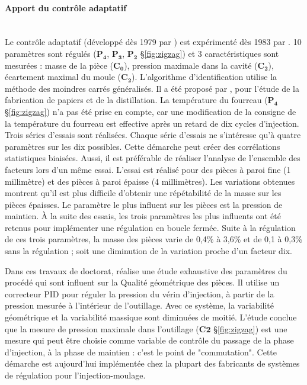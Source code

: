 \paragraph{Apport du contrôle adaptatif}\mbox{} \\
Le contrôle adaptatif (développé dès 1979 par \cite{landau_adaptive_1979, egardt_stability_1979}) est expérimenté dès 1983 par \cite{sanschagrin_process_1983}.
10 paramètres sont régulés ($\boldsymbol{P_4}$, $\boldsymbol{P_3}$, $\boldsymbol{P_2}$ §\ref{fig:zigzag}) et 3 caractéristiques sont mesurées : masse de la pièce ($\boldsymbol{C_0}$), pression maximale dans la cavité ($\boldsymbol{C_2}$), écartement maximal du moule ($\boldsymbol{C_2}$).
L'algorithme d'identification utilise la méthode des moindres carrés généralisés.
Il a été proposé par \cite{bethoux_approche_1976}, pour l'étude de la fabrication de papiers et de la distillation.
La température du fourreau ($\boldsymbol{P_4}$ §\ref{fig:zigzag}) n'a pas été prise en compte, car une modification de la consigne de la température du fourreau est effective après un retard de dix cycles d’injection.
Trois séries d'essais sont réalisées.
Chaque série d’essais ne s’intéresse qu’à quatre paramètres sur les dix possibles.
Cette démarche peut créer des corrélations statistiques biaisées.
Aussi, il est préférable de réaliser l'analyse de l'ensemble des facteurs lors d'un même essai.
L'essai est réalisé pour des pièces à paroi fine (1 millimètre) et des pièces à paroi épaisse (4 millimètres).
Les variations obtenues montrent qu'il est plus difficile d'obtenir une répétabilité de la masse sur les pièces épaisses.
Le paramètre le plus influent sur les pièces est la pression de maintien.
À la suite des essais, les trois paramètres les plus influents ont été retenus pour implémenter une régulation en boucle fermée.
Suite à la régulation de ces trois paramètres, la masse des pièces varie de 0,4\% à 3,6\% et de 0,1 à 0,3\% sans la régulation ; soit une diminution de la variation proche d’un facteur dix.

Dans ces travaux de doctorat, \cite{devos_contribution_1990} réalise une étude exhaustive des paramètres du procédé qui sont influent sur la Qualité géométrique des pièces.
Il utilise un correcteur PID pour réguler la pression du vérin d’injection, à partir de la pression mesurée à l'intérieur de l'outillage.
Avec ce système, la variabilité géométrique et la variabilité massique sont diminuées de moitié.
L'étude conclue que la mesure de pression maximale dans l'outillage  ($\boldsymbol{C2}$ §\ref{fig:zigzag}) est une mesure qui peut être choisie comme variable de contrôle du passage de la phase d’injection, à la phase de maintien : c'est le point de "commutation".
Cette démarche est aujourd'hui implémentée chez la plupart des fabricants de systèmes de régulation pour l'injection-moulage.

